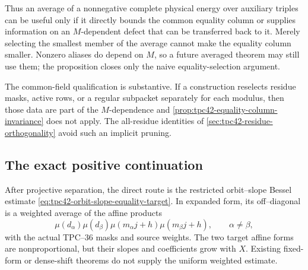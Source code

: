 Thus an average of a nonnegative complete physical energy over auxiliary
triples can be useful only if it directly bounds the common equality
column or supplies information on an \(M\)-dependent defect that can be
transferred back to it.  Merely selecting the smallest member of the
average cannot make the equality column smaller.  Nonzero aliases do
depend on \(M\), so a future averaged theorem may still use them; the
proposition closes only the naive equality-selection argument.

The common-field qualification is substantive.  If a construction
reselects residue masks, active rows, or a regular subpacket separately
for each modulus, then those data are part of the \(M\)-dependence and
\cref{prop:tpc42-equality-column-invariance} does not apply.  The
all-residue identities of \cref{sec:tpc42-residue-orthogonality} avoid
such an implicit pruning.

\subsection{The exact positive continuation}

After projective separation, the direct route is the restricted
orbit--slope Bessel estimate
\eqref{eq:tpc42-orbit-slope-equality-target}.  In expanded form, its
off--diagonal is a weighted average of the affine products
\begin{equation}
 \mu(d_\alpha)\mu(d_\beta)
 \mu(m_\alpha j+h)\mu(m_\beta j+h),
 \qquad \alpha\ne\beta,
 \label{eq:tpc42-next-four-mobius}
\end{equation}
with the actual TPC--36 masks and source weights.  The two target affine
forms are nonproportional, but their slopes and coefficients grow with
\(X\).  Existing fixed-form or dense-shift theorems do not supply the
uniform weighted estimate.

